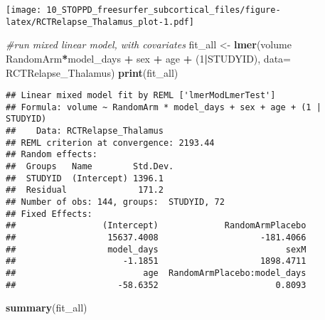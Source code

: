 \documentclass[]{article}
\newenvironment{Shaded}{\begin{snugshade}}{\end{snugshade}}
\newcommand{\KeywordTok}[1]{\textcolor[rgb]{0.13,0.29,0.53}{\textbf{#1}}}
\newcommand{\DataTypeTok}[1]{\textcolor[rgb]{0.13,0.29,0.53}{#1}}
\newcommand{\DecValTok}[1]{\textcolor[rgb]{0.00,0.00,0.81}{#1}}
\newcommand{\StringTok}[1]{\textcolor[rgb]{0.31,0.60,0.02}{#1}}
\newcommand{\CommentTok}[1]{\textcolor[rgb]{0.56,0.35,0.01}{\textit{#1}}}
\newcommand{\OperatorTok}[1]{\textcolor[rgb]{0.81,0.36,0.00}{\textbf{#1}}}
\newcommand{\NormalTok}[1]{#1}
\theoremstyle{definition}
\theoremstyle{definition}
\theoremstyle{definition}
\theoremstyle{remark}
\begin{document}
\texttt{[image: 10\_STOPPD\_freesurfer\_subcortical\_files/figure-latex/RCTRelapse\_Thalamus\_plot-1.pdf]}

\begin{Shaded}
\begin{Highlighting}[]
\CommentTok{#run mixed linear model, with covariates}
\NormalTok{  fit_all <-}\StringTok{ }\KeywordTok{lmer}\NormalTok{(volume }\OperatorTok{~}\StringTok{ }\NormalTok{RandomArm}\OperatorTok{*}\NormalTok{model_days }\OperatorTok{+}\StringTok{ }\NormalTok{sex }\OperatorTok{+}\StringTok{ }\NormalTok{age }\OperatorTok{+}\StringTok{ }\NormalTok{(}\DecValTok{1}\OperatorTok{|}\NormalTok{STUDYID), }\DataTypeTok{data=}\NormalTok{ RCTRelapse_Thalamus)}
  \KeywordTok{print}\NormalTok{(fit_all)}
\end{Highlighting}
\end{Shaded}

\begin{verbatim}
## Linear mixed model fit by REML ['lmerModLmerTest']
## Formula: volume ~ RandomArm * model_days + sex + age + (1 | STUDYID)
##    Data: RCTRelapse_Thalamus
## REML criterion at convergence: 2193.44
## Random effects:
##  Groups   Name        Std.Dev.
##  STUDYID  (Intercept) 1396.1  
##  Residual              171.2  
## Number of obs: 144, groups:  STUDYID, 72
## Fixed Effects:
##                 (Intercept)             RandomArmPlacebo  
##                  15637.4008                    -181.4066  
##                  model_days                         sexM  
##                     -1.1851                    1898.4711  
##                         age  RandomArmPlacebo:model_days  
##                    -58.6352                       0.8093
\end{verbatim}

\begin{Shaded}
\begin{Highlighting}[]
  \KeywordTok{summary}\NormalTok{(fit_all)}
\end{Highlighting}
\end{Shaded}
\end{document}

